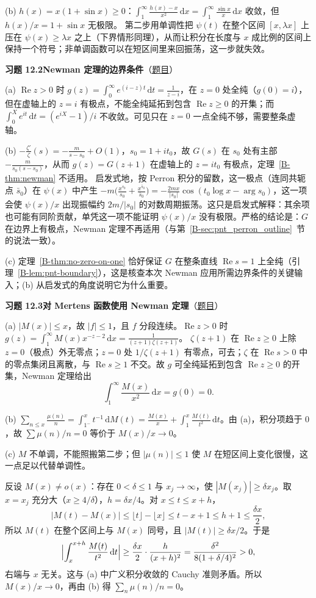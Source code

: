 \documentclass[11pt,a4paper]{article}
\newcommand{\dd}{\,\mathrm{d}}
\renewcommand{\Re}{\operatorname{Re}}
\newcommand{\bref}[1]{\ref*{B-#1}}
\newcommand{\Sol}[2]{%
  \par\addvspace{1.2em}\noindent
  \hypertarget{s:#1}{}\textbf{习题 #1\quad #2}\hfill{\small（\hyperlink{q:#1}{题目}）}\par
  \nopagebreak\smallskip}
\begin{document}
(b) $h(x)=x(1+\sin x)\ge0$：$\int_1^\infty\frac{h(x)-x}{x^2}\dd x=\int_1^\infty\frac{\sin x}x\dd x$ 收敛，但 $h(x)/x=1+\sin x$ 无极限。
第二步用单调性把 $\psi(t)$ 在整个区间 $[x,\lambda x]$ 上压在 $\psi(x)\ge\lambda x$ 之上（下界情形同理），从而让积分在长度与 $x$ 成比例的区间上保持一个符号；非单调函数可以在短区间里来回振荡，这一步就失效。

\Sol{12.2}{Newman 定理的边界条件}
(a) $\Re z>0$ 时 $g(z)=\int_0^\infty e^{(i-z)t}\dd t=\frac1{z-i}$，在 $z=0$ 处全纯（$g(0)=i$），但在虚轴上的 $z=i$ 有极点，不能全纯延拓到包含 $\Re z\ge0$ 的开集；而 $\int_0^X e^{it}\dd t=(e^{iX}-1)/i$ 不收敛。可见只在 $z=0$ 一点全纯不够，需要整条虚轴。

(b) $-\frac{\zeta'}{\zeta}(s)=-\frac m{s-s_0}+O(1)$，$s_0=1+it_0$，故 $G(s)$ 在 $s_0$ 处有主部 $-\frac m{s_0(s-s_0)}$，从而 $g(z)=G(z+1)$ 在虚轴上的 $z=it_0$ 有极点，定理~\bref{thm:newman} 不适用。
启发式地，按 Perron 积分的留数，这一极点（连同共轭点 $\bar s_0$）在 $\psi(x)$ 中产生 $-m\bigl(\frac{x^{s_0}}{s_0}+\frac{x^{\bar s_0}}{\bar s_0}\bigr)=-\frac{2mx}{|s_0|}\cos(t_0\log x-\arg s_0)$，这一项会使 $\psi(x)/x$ 出现振幅约 $2m/|s_0|$ 的对数周期振荡。这只是启发式解释：其余项也可能有同阶贡献，单凭这一项不能证明 $\psi(x)/x$ 没有极限。严格的结论是：$G$ 在边界上有极点，Newman 定理不再适用（与第~\bref{sec:pnt_perron_outline}~节的说法一致）。

(c) 定理~\bref{thm:no-zero-on-one} 恰好保证 $G$ 在整条直线 $\Re s=1$ 上全纯（引理~\bref{lem:pnt-boundary}），这是核查本次 Newman 应用所需边界条件的关键输入；(b) 从启发式的角度说明它为什么重要。

\Sol{12.3}{对 Mertens 函数使用 Newman 定理}
(a) $|M(x)|\le x$，故 $|f|\le1$，且 $f$ 分段连续。$\Re z>0$ 时
$g(z)=\int_1^\infty M(x)x^{-z-2}\dd x=\frac1{(z+1)\zeta(z+1)}$。
$\zeta(z+1)$ 在 $\Re z\ge0$ 上除 $z=0$（极点）外无零点；$z=0$ 处 $1/\zeta(z+1)$ 有零点，可去；$\zeta$ 在 $\Re s>0$ 中的零点集闭且离散，与 $\Re s\ge1$ 不交。故 $g$ 可全纯延拓到包含 $\Re z\ge0$ 的开集，Newman 定理给出
\[
  \int_1^\infty\frac{M(x)}{x^2}\dd x=g(0)=0 .
\]

(b) $\sum_{n\le x}\frac{\mu(n)}n=\int_{1^-}^x t^{-1}\dd M(t)=\frac{M(x)}x+\int_1^x\frac{M(t)}{t^2}\dd t$。由 (a)，积分项趋于 $0$，故 $\sum\mu(n)/n=0$ 等价于 $M(x)/x\to0$。

(c) $M$ 不单调，不能照搬第二步；但 $|\mu(n)|\le1$ 使 $M$ 在短区间上变化很慢，这一点足以代替单调性。

反设 $M(x)\ne o(x)$：存在 $0<\delta\le1$ 与 $x_j\to\infty$，使 $|M(x_j)|\ge\delta x_j$。取 $x=x_j$ 充分大（$x\ge4/\delta$），$h=\delta x/4$。对 $x\le t\le x+h$，
\[
  |M(t)-M(x)|\le\lfloor t\rfloor-\lfloor x\rfloor\le t-x+1\le h+1\le\frac{\delta x}2 ,
\]
所以 $M(t)$ 在整个区间上与 $M(x)$ 同号，且 $|M(t)|\ge\delta x/2$。于是
\[
  \Bigl|\int_x^{x+h}\frac{M(t)}{t^2}\dd t\Bigr|\ge\frac{\delta x}2\cdot\frac{h}{(x+h)^2}=\frac{\delta^2}{8(1+\delta/4)^2}>0 ,
\]
右端与 $x$ 无关。这与 (a) 中广义积分收敛的 Cauchy 准则矛盾。所以 $M(x)/x\to0$，再由 (b) 得 $\sum_n\mu(n)/n=0$。
\end{document}
